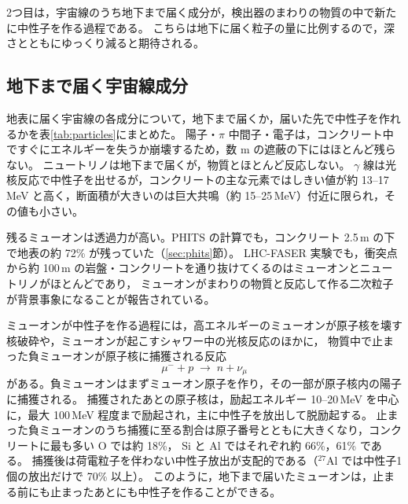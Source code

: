 \documentclass[a4paper,11pt]{ltjsarticle}
\begin{document}
2つ目は，宇宙線のうち地下まで届く成分が，検出器のまわりの物質の中で新たに中性子を作る過程である。
こちらは地下に届く粒子の量に比例するので，深さとともにゆっくり減ると期待される。

\subsection{地下まで届く宇宙線成分}

地表に届く宇宙線の各成分について，地下まで届くか，届いた先で中性子を作れるかを表\ref{tab:particles}にまとめた。
陽子・$\pi$ 中間子・電子は，コンクリート中ですぐにエネルギーを失うか崩壊するため，数 m の遮蔽の下にはほとんど残らない。
ニュートリノは地下まで届くが，物質とほとんど反応しない。
$\gamma$ 線は光核反応で中性子を出せるが，コンクリートの主な元素ではしきい値が約 13--17\,MeV と高く，断面積が大きいのは巨大共鳴（約 15--25\,MeV）付近に限られ，その値も小さい。

残るミューオンは透過力が高い。PHITS の計算でも，コンクリート 2.5\,m の下で地表の約 72\% が残っていた（\ref{sec:phits}節）。
LHC-FASER 実験でも，衝突点から約 100\,m の岩盤・コンクリートを通り抜けてくるのはミューオンとニュートリノがほとんどであり，
ミューオンがまわりの物質と反応して作る二次粒子が背景事象になることが報告されている\cite{FASER2026}。

ミューオンが中性子を作る過程には，高エネルギーのミューオンが原子核を壊す核破砕や，ミューオンが起こすシャワー中の光核反応のほかに，
物質中で止まった負ミューオンが原子核に捕獲される反応
\begin{equation}
  \mu^- + p \;\to\; n + \nu_\mu
\end{equation}
がある。負ミューオンはまずミューオン原子を作り，その一部が原子核内の陽子に捕獲される。
捕獲されたあとの原子核は，励起エネルギー 10--20\,MeV を中心に，最大 100\,MeV 程度まで励起され，主に中性子を放出して脱励起する\cite{Mizuno2025,MizunoJPS2026}。
止まった負ミューオンのうち捕獲に至る割合は原子番号とともに大きくなり，コンクリートに最も多い O では約 18\%\cite{Suzuki1987}，
Si と Al ではそれぞれ約 66\%，61\% である。
捕獲後は荷電粒子を伴わない中性子放出が支配的である（${}^{27}$Al では中性子1個の放出だけで 70\% 以上）\cite{Mizuno2025}。
このように，地下まで届いたミューオンは，止まる前にも止まったあとにも中性子を作ることができる。
\end{document}
